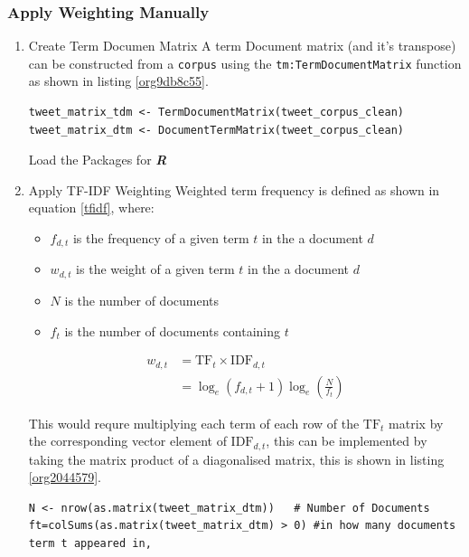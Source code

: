 \documentclass[11pt]{article}
\begin{document}
\subsubsection{Apply Weighting Manually}
\label{sec:org993ecd4}
\begin{enumerate}
\item Create Term Documen Matrix
\label{sec:org5a2f188}
A term Document matrix (and it's transpose) can be constructed from a \texttt{corpus} using the
\texttt{tm:TermDocumentMatrix} function as shown in listing \ref{org9db8c55}.

\begin{listing}[htbp]
\begin{verbatim}
tweet_matrix_tdm <- TermDocumentMatrix(tweet_corpus_clean)
tweet_matrix_dtm <- DocumentTermMatrix(tweet_corpus_clean)
\end{verbatim}
\caption{\label{org9db8c55}Load the Packages for \textbf{\textbf{\emph{R}}}}
\end{listing}

\item Apply TF-IDF Weighting
\label{sec:org2c3cfb8}
Weighted term frequency is defined as shown in equation \eqref{tfidf}, where:

\begin{itemize}
\item \(f_{d,t}\) is the frequency of a given term \(t\) in the a document \(d\)
\item \(w_{d,t}\) is the weight of a given term \(t\) in the a document \(d\)
\item \(N\) is the number of documents
\item \(f_{t}\) is the number of documents containing \(t\)
\end{itemize}

\begin{equation}\begin{aligned}
w_{d, t} &=\mathrm{TF}_{t} \times \mathrm{IDF}_{d, t} \\
&=\log _{e}\left(f_{d, t}+1\right) \log _{e}\left(\frac{N}{f_{t}}\right) \label{tfidf}
\end{aligned}\end{equation}

This would requre multiplying each term of each row of the \(\mathrm{TF}_{t}\) matrix by the corresponding vector element of \(\mathrm{IDF}_{d,t}\), this can be implemented by taking the matrix product of a diagonalised matrix, this is shown in listing \ref{org2044579}.

\begin{listing}[htbp]
\begin{verbatim}
N <- nrow(as.matrix(tweet_matrix_dtm))   # Number of Documents
ft=colSums(as.matrix(tweet_matrix_dtm) > 0) #in how many documents term t appeared in,


\end{verbatim}
\end{listing}
\end{enumerate}
\end{document}
